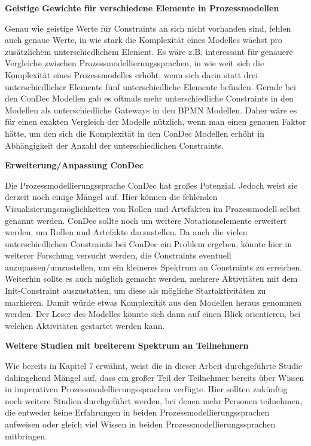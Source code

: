 \textbf{Geistige Gewichte für verschiedene Elemente in Prozessmodellen}

Genau wie geistige Werte für Constraints an sich nicht vorhanden sind, fehlen auch genaue Werte, in wie stark die Komplexität eines Modelles wächst pro zusätzlichem unterschiedlichem Element. Es wäre z.B. interessant für genauere Vergleiche zwischen Prozessmodellierungssprachen, in wie weit sich die Komplexität eines Prozessmodelles erhöht, wenn sich darin statt drei unterschiedlicher Elemente fünf unterschiedliche Elemente befinden. Gerade bei den ConDec Modellen gab es oftmals mehr unterschiedliche Constraints in den Modellen als unterschiedliche Gateways in den BPMN Modellen. Daher wäre es für einen exakten Vergleich der Modelle nützlich, wenn man einen genauen Faktor hätte, um den sich die Komplexität in den ConDec Modellen erhöht in Abhängigkeit der Anzahl der unterschiedlichen Constraints. \newline 


\textbf{Erweiterung/Anpassung ConDec}

Die Prozessmodellierungssprache ConDec hat großes Potenzial. Jedoch weist sie derzeit noch einige Mängel auf. Hier können die fehlenden Visualisierungsmöglichkeiten von Rollen und Artefakten im Prozessmodell selbst genannt werden. ConDec sollte noch um weitere Notationselemente erweitert werden, um Rollen und Artefakte darzustellen.\newline
Da auch die vielen unterschiedlichen Constraints bei ConDec ein Problem ergeben, könnte hier in weiterer Forschung versucht werden, die Constraints eventuell anzupassen/umzustellen, um ein kleineres Spektrum an Constraints zu erreichen.\newline
Weiterhin sollte es auch möglich gemacht werden, mehrere Aktivitäten mit dem Init-Constraint auszustatten, um diese als mögliche Startaktivitäten zu markieren. Damit würde etwas Komplexität aus den Modellen heraus genommen werden. Der Leser des Modelles könnte sich dann auf einen Blick orientieren, bei welchen Aktivitäten gestartet werden kann.\newline

\newpage

\textbf{Weitere Studien mit breiterem Spektrum an Teilnehmern}

Wie bereits in Kapitel 7 erwähnt, weist die in dieser Arbeit durchgeführte Studie dahingehend Mängel auf, dass ein großer Teil der Teilnehmer bereits über Wissen in imperativen Prozessmodellierungssprachen verfügte. Hier sollten zukünftig noch weitere Studien durchgeführt werden, bei denen mehr Personen teilnehmen, die entweder keine Erfahrungen in beiden Prozessmodellierungssprachen aufweisen oder gleich viel Wissen in beiden Prozessmodellierungssprachen mitbringen.\newline





